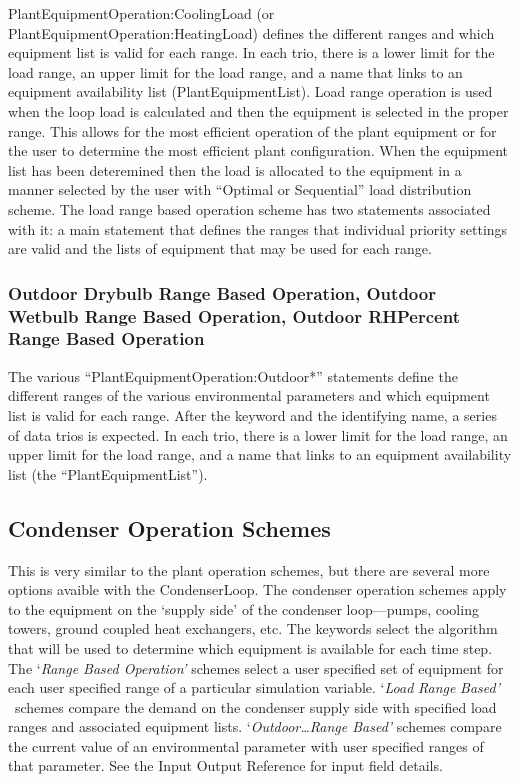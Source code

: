 PlantEquipmentOperation:CoolingLoad (or PlantEquipmentOperation:HeatingLoad) defines the different ranges and which equipment list is valid for each range. In each trio, there is a lower limit for the load range, an upper limit for the load range, and a name that links to an equipment availability list (PlantEquipmentList). Load range operation is used when the loop load is calculated and then the equipment is selected in the proper range. This allows for the most efficient operation of the plant equipment or for the user to determine the most efficient plant configuration. When the equipment list has been deteremined then the load is allocated to the equipment in a manner selected by the user with ``Optimal or Sequential'' load distribution scheme. The load range based operation scheme has two statements associated with it: a main statement that defines the ranges that individual priority settings are valid and the lists of equipment that may be used for each range.

\subsubsection{Outdoor Drybulb Range Based Operation, Outdoor Wetbulb Range Based Operation, Outdoor RHPercent Range Based Operation}\label{outdoor-drybulb-range-based-operation-outdoor-wetbulb-range-based-operation-outdoor-rhpercent-range-based-operation}

The various ``PlantEquipmentOperation:Outdoor*'' statements define the different ranges of the various environmental parameters and which equipment list is valid for each range. After the keyword and the identifying name, a series of data trios is expected. In each trio, there is a lower limit for the load range, an upper limit for the load range, and a name that links to an equipment availability list (the ``PlantEquipmentList'').

\subsection{Condenser Operation Schemes}\label{condenser-operation-schemes}

This is very similar to the plant operation schemes, but there are several more options avaible with the CondenserLoop. The condenser operation schemes apply to the equipment on the `supply side' of the condenser loop---pumps, cooling towers, ground coupled heat exchangers, etc. The keywords select the algorithm that will be used to determine which equipment is available for each time step. The `\emph{Range Based Operation'} schemes select a user specified set of equipment for each user specified range of a particular simulation variable. `\emph{Load} \emph{Range} \emph{Based'} ~schemes compare the demand on the condenser supply side with specified load ranges and associated equipment lists. `\emph{Outdoor\ldots{}Range Based'} schemes compare the current value of an environmental parameter with user specified ranges of that parameter. See the Input Output Reference for input field details.


